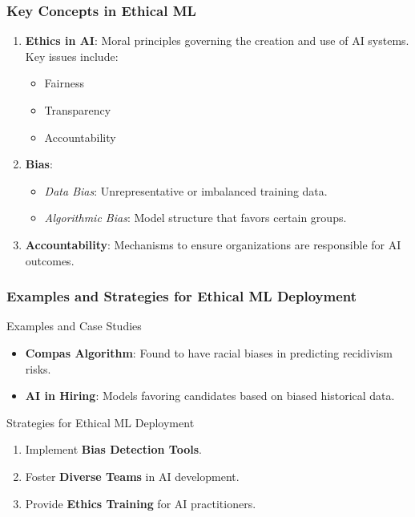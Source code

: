 \documentclass[aspectratio=169]{beamer}
\begin{document}
\begin{frame}[fragile]
    \frametitle{Key Concepts in Ethical ML}
    \begin{enumerate}
        \item \textbf{Ethics in AI}: Moral principles governing the creation and use of AI systems. Key issues include:
        \begin{itemize}
            \item Fairness
            \item Transparency
            \item Accountability
        \end{itemize}
        
        \item \textbf{Bias}:
        \begin{itemize}
            \item \textit{Data Bias}: Unrepresentative or imbalanced training data.
            \item \textit{Algorithmic Bias}: Model structure that favors certain groups.
        \end{itemize}
        
        \item \textbf{Accountability}: Mechanisms to ensure organizations are responsible for AI outcomes.
    \end{enumerate}
\end{frame}

\begin{frame}[fragile]
    \frametitle{Examples and Strategies for Ethical ML Deployment}
    \begin{block}{Examples and Case Studies}
        \begin{itemize}
            \item \textbf{Compas Algorithm}: Found to have racial biases in predicting recidivism risks.
            \item \textbf{AI in Hiring}: Models favoring candidates based on biased historical data.
        \end{itemize}
    \end{block}
    
    \begin{block}{Strategies for Ethical ML Deployment}
        \begin{enumerate}
            \item Implement \textbf{Bias Detection Tools}.
            \item Foster \textbf{Diverse Teams} in AI development.
            \item Provide \textbf{Ethics Training} for AI practitioners.
        \end{enumerate}
    \end{block}
\end{frame}
\end{document}
